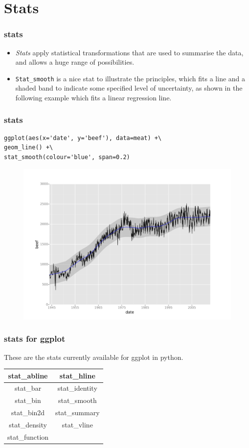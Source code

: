 \documentclass{beamer}
\begin{document}
\section{Stats}
\begin{frame}
\frametitle{stats}
\Large
\begin{itemize}
\item \textit{Stats} apply statistical transformations that are used to summarise the data, and allows a huge range of possibilities. \item \texttt{Stat\_smooth} is a nice stat to illustrate the principles, which fits a line and a shaded band to indicate some specified level of uncertainty, as shown in the following example which fits a linear regression line.
\end{itemize}
\end{frame}
\begin{frame}[fragile]
\frametitle{stats}
\Large
\begin{framed}
\begin{verbatim}
ggplot(aes(x='date', y='beef'), data=meat) +\
geom_line() +\
stat_smooth(colour='blue', span=0.2)
\end{verbatim}
\end{framed}
\end{frame}
\begin{frame}
\begin{figure}
\centering
\includegraphics[width=0.7\linewidth]{stats1}
\end{figure}
\end{frame}
\begin{frame}
	\frametitle{stats for ggplot}
	\Large
	These are the stats currently available for ggplot in python.\\
	\bigskip
	\begin{center}
	\begin{tabular}{|c|c|}\hline
	stat\_abline	&	stat\_hline	\\ \hline
	stat\_bar	&	stat\_identity	\\ \hline
	stat\_bin	&	stat\_smooth	\\ \hline
	stat\_bin2d	&	stat\_summary	\\ \hline
	stat\_density	&	stat\_vline	\\ \hline
	stat\_function	&		\\ \hline
	\end{tabular} 
	\end{center}
\end{frame}
\end{document}
